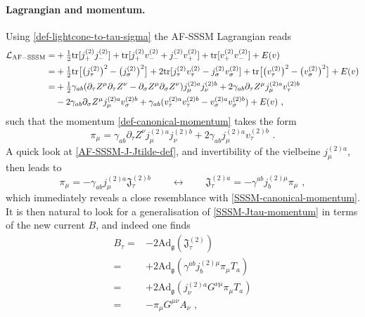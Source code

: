 \documentclass[12pt]{article}
\numberwithin{equation}{section}
\begin{document}
\paragraph{Lagrangian and momentum.} Using \eqref{def-lightcone-to-tau-sigma} the AF-SSSM Lagrangian reads
\begin{align}
\mathcal{L}_{\mathrm{AF-SSSM}}=&+\tfrac{1}{2}\mathrm{tr}[j^{(2)}_{+}j^{(2)}_{-}]+\mathrm{tr}[j^{(2)}_{+}v_{-}^{(2)}+j^{(2)}_{-}v_{+}^{(2)}]+\mathrm{tr}[v_{+}^{(2)}v_{-}^{(2)}]+E(v)
\notag \\
=&+\tfrac{1}{2}\mathrm{tr}\bigl[\bigl(j^{(2)}_{\tau}\bigr)^2-\bigl(j^{(2)}_{\sigma}\bigr)^2\bigr]+2\mathrm{tr}[j^{(2)}_{\tau}v_{\tau}^{(2)}-j^{(2)}_{\sigma}v_{\sigma}^{(2)}]+\mathrm{tr}\bigl[\bigl(v_{\tau}^{(2)}\bigr)^2-\bigl(v_{\sigma}^{(2)}\bigr)^2\bigr]+E(v)
\notag \\
=&+\tfrac{1}{2}\gamma_{ab}(\partial_{\tau}Z^{\mu}\partial_{\tau}Z^{\nu}-\partial_{\sigma}Z^{\mu}\partial_{\sigma}Z^{\nu})j_{\mu}^{(2)a}j_{\nu}^{(2)b}+2\gamma_{ab}\partial_{\tau}Z^{\mu}j_{\mu}^{(2)a}v_{\tau}^{(2)b}
\notag \\
&-2\gamma_{ab}\partial_{\sigma}Z^{\mu}j_{\mu}^{(2)a}v_{\sigma}^{(2)b}+\gamma_{ab}(v_{\tau}^{(2)a}v_{\tau}^{(2)b}-v_{\sigma}^{(2)a}v_{\sigma}^{(2)b})+E(v) \,\, ,
\end{align}
such that the momentum \eqref{def-canonical-momentum} takes the form
\begin{equation}
\pi_{\mu}=\gamma_{ab}\partial_{\tau}Z^{\nu}j_{\mu}^{(2)a}j_{\nu}^{(2)b}+2\gamma_{ab}j_{\mu}^{(2)a}v_{\tau}^{(2)b} \,\, .
\end{equation}
A quick look at \eqref{AF-SSSM-J-Jtilde-def}, and invertibility of the vielbeine $j_{\mu}^{(2)a}$, then leads to
\begin{equation}\label{AF-SSSM-canonical-momentum}
\pi_{\mu}=-\gamma_{ab}j_{\mu}^{(2)a}\mathfrak{J}_{\tau}^{(2)b}
\qquad \longleftrightarrow \qquad
\mathfrak{J}_{\tau}^{(2)a}=-\gamma^{ab}j_{b}^{(2)\mu}\pi_{\mu} \,\, ,
\end{equation}
which immediately reveals a close resemblance with \eqref{SSSM-canonical-momentum}. It is then natural to look for a generalisation of \eqref{SSSM-Jtau-momentum} in terms of the new current $B$, and indeed one finds
\begin{equation}
\begin{aligned}
B_{\tau}=&-2\mathrm{Ad}_{\mathfrak{g}}(\mathfrak{J}_{\tau}^{(2)})
\\
=&+2\mathrm{Ad}_{\mathfrak{g}}(\gamma^{ab}j_{b}^{(2)\mu}\pi_{\mu}T_{a})
\\
=&+2\mathrm{Ad}_{\mathfrak{g}}(j_{\nu}^{(2)a}G^{\nu\mu}\pi_{\mu}T_{a})
\\
=&-\pi_{\mu}G^{\mu\nu}A_{\nu} \,\, ,
\end{aligned}
\end{equation}
\end{document}
